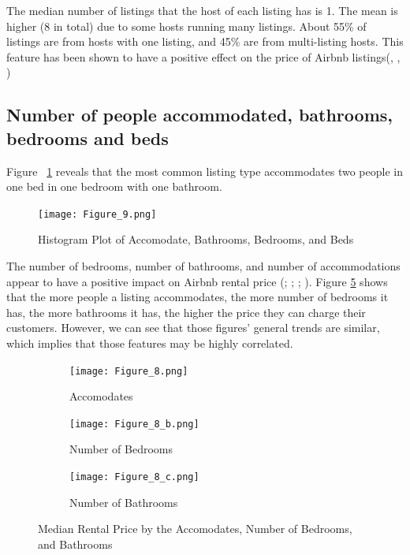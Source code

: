 The median number of listings that the host of each listing has is 1. The mean
is higher (8 in total) due to some hosts running many listings. About 55\% of
listings are from hosts with one listing, and 45\% are from multi-listing hosts.
This feature has been shown to have a positive effect on the price of Airbnb
listings(\cite{chen2017consumer}, \cite{ert2016trust}, \cite{wang2017price})

\subsection{Number of people accommodated, bathrooms, bedrooms and beds}

Figure ~\ref{fig:hist-accommodates} reveals that the most common listing type accommodates two people in
one bed in one bedroom with one bathroom.

\begin{figure}[H] \centering
    \texttt{[image: Figure\_9.png]}
    \caption{Histogram Plot of Accomodate, Bathrooms, Bedrooms, and Beds}
    \label{fig:hist-accommodates}
\end{figure}


The number of bedrooms, number of bathrooms, and number of accommodations appear
to have a positive impact on Airbnb rental price (\cite{ert2016trust};
\cite{chen2017consumer}; \cite{wang2017price}; \cite{gibbs2018use}). Figure
\ref{fig:accommodates-bedrooms-bathrooms} shows that the more people a listing
accommodates, the more number of bedrooms it has, the more bathrooms it has, the
higher the price they can charge their customers. However, we can see that those
figures' general trends are similar, which implies that those features may be
highly correlated.

\begin{figure}[H]
    \centering
    \begin{subfigure}[b]{0.48\textwidth}
        \centering
        \texttt{[image: Figure\_8.png]}
        \caption{Accomodates}
        \label{fig:median-price-by-accommodates}
    \end{subfigure}
    \begin{subfigure}[b]{0.48\textwidth}
        \centering
        \texttt{[image: Figure\_8\_b.png]}
        \caption{Number of Bedrooms}
        \label{fig:median-price-by-number-of-bedrooms}
    \end{subfigure}
    \begin{subfigure}[b]{0.48\textwidth}
        \centering
        \texttt{[image: Figure\_8\_c.png]}
        \caption{Number of Bathrooms}
        \label{fig:median-price-by-number-of-bathrooms}
    \end{subfigure}
    \caption{Median Rental Price by the Accomodates, Number of Bedrooms, and Bathrooms}
    \label{fig:accommodates-bedrooms-bathrooms}
\end{figure}

